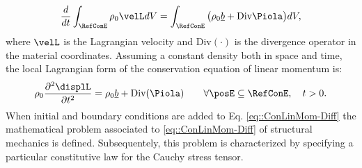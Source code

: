 \begin{equation}
  \frac{d}{dt}\int_{\RefConE}\rho_0\velL  dV = \int_{\RefConE}\big(\rho_0\underline{b}+\text{Div}\Piola \big)dV,
\end{equation}
where $\velL$ is the Lagrangian velocity and $\text{Div}(\cdot)$ is the divergence operator in the material coordinates. Assuming a constant density both in space and time, the local Lagrangian form of the conservation equation of linear momentum is:
\begin{equation}
  \rho_0\frac{\partial^2\displL}{\partial t^2}=\rho_0\underline{b}+\text{Div}(\Piola) \qquad \forall \posE \subseteq \RefConE, \quad t>0. 
  \label{eq::ConLinMom-Diff}
\end{equation}
When initial and boundary conditions are added to Eq. \eqref{eq::ConLinMom-Diff} the mathematical problem associated to \eqref{eq::ConLinMom-Diff} of structural mechanics is defined. Subsequentely, this problem is characterized by specifying a particular constitutive law for the Cauchy stress tensor.

